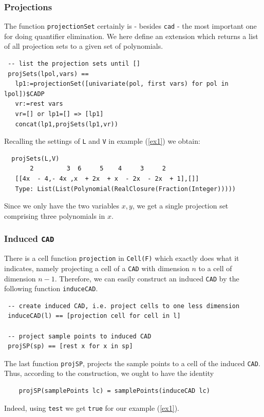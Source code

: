 \documentclass[12pt,a4paper]{article}
\newcommand{\CAD}{{\tt CAD}}
\begin{document}
\subsubsection{Projections}
The function {\tt projectionSet} certainly is - besides {\tt cad} - the most 
important one for doing quantifier elimination. We here define an extension
which returns a list of all projection sets to a given set of polynomials.
%
\begin{lstlisting} 
 -- list the projection sets until []
 projSets(lpol,vars) ==
   lp1:=projectionSet([univariate(pol, first vars) for pol in lpol])$CADP
   vr:=rest vars
   vr=[] or lp1=[] => [lp1]
   concat(lp1,projSets(lp1,vr))
\end{lstlisting}
%
Recalling the settings of {\tt L} and {\tt V} in example (\ref{ex1}) we obtain:
%
\begin{verbatim}
  projSets(L,V)
       2         3  6     5    4     3     2
   [[4x  - 4,- 4x ,x  + 2x  + x  - 2x  - 2x  + 1],[]] 
   Type: List(List(Polynomial(RealClosure(Fraction(Integer)))))
\end{verbatim}
Since we only have the two variables $x,y$, we get a single projection
set comprising three polynomials in $x$.  
%
\subsubsection{Induced \CAD}
%
There is a cell function {\tt projection} in {\tt Cell(F)} which exactly
does what it indicates, namely projecting a cell of a {\CAD} with dimension
$n$ to a cell of dimension $n-1$. Therefore, we can easily construct an
induced {\CAD} by the following function {\tt induceCAD}.
%
\begin{lstlisting}
 -- create induced CAD, i.e. project cells to one less dimension
 induceCAD(l) == [projection cell for cell in l]

 -- project sample points to induced CAD
 projSP(sp) == [rest x for x in sp]
\end{lstlisting}
The last function {\tt projSP}, projects the sample points to a cell of the 
induced \CAD. Thus, according to the construction, we ought to have the 
identity
%
\begin{verbatim}
    projSP(samplePoints lc) = samplePoints(induceCAD lc)
\end{verbatim}
Indeed, using {\tt test} we get {\tt true} for our example (\ref{ex1}).
%
\end{document}
